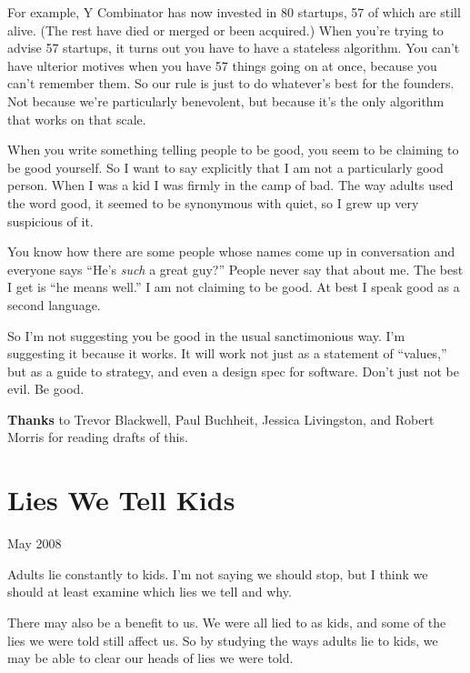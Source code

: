 \documentclass[12pt]{book}
\begin{document}
For example, Y Combinator has now invested in 80 startups, 57 of which
are still alive. (The rest have died or merged or been acquired.) When
you're trying to advise 57 startups, it turns out you have to have a
stateless algorithm. You can't have ulterior motives when you have 57
things going on at once, because you can't remember them. So our rule is
just to do whatever's best for the founders. Not because we're
particularly benevolent, but because it's the only algorithm that works
on that scale.

When you write something telling people to be good, you seem to be
claiming to be good yourself. So I want to say explicitly that I am not
a particularly good person. When I was a kid I was firmly in the camp of
bad. The way adults used the word good, it seemed to be synonymous with
quiet, so I grew up very suspicious of it.

You know how there are some people whose names come up in conversation
and everyone says ``He's \emph{such} a great guy?'' People never say
that about me. The best I get is ``he means well.'' I am not claiming to
be good. At best I speak good as a second language.

So I'm not suggesting you be good in the usual sanctimonious way. I'm
suggesting it because it works. It will work not just as a statement of
``values,'' but as a guide to strategy, and even a design spec for
software. Don't just not be evil. Be good.


\textbf{Thanks} to Trevor Blackwell, Paul Buchheit, Jessica Livingston,
and Robert Morris for reading drafts of this.
\chapter{Lies We Tell Kids}

May 2008

Adults lie constantly to kids. I'm not saying we should stop, but I
think we should at least examine which lies we tell and why.

There may also be a benefit to us. We were all lied to as kids, and some
of the lies we were told still affect us. So by studying the ways adults
lie to kids, we may be able to clear our heads of lies we were told.
\end{document}
